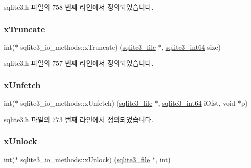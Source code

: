 sqlite3.\+h 파일의 758 번째 라인에서 정의되었습니다.

\mbox{\label{structsqlite3__io__methods_abe797948913bfe94d4fab7246773af50}} 
\subsubsection{\texorpdfstring{x\+Truncate}{xTruncate}}
{\footnotesize\ttfamily int($\ast$ sqlite3\+\_\+io\+\_\+methods\+::x\+Truncate) (\hyperlink{structsqlite3__file}{sqlite3\+\_\+file} $\ast$, \hyperlink{sqlite3_8h_a0a4d3e6c1ad46f90e746b920ab6ca0d2}{sqlite3\+\_\+int64} size)}



sqlite3.\+h 파일의 757 번째 라인에서 정의되었습니다.

\mbox{\label{structsqlite3__io__methods_abebf1bbaa50bea56f0e37d0f66193bda}} 
\subsubsection{\texorpdfstring{x\+Unfetch}{xUnfetch}}
{\footnotesize\ttfamily int($\ast$ sqlite3\+\_\+io\+\_\+methods\+::x\+Unfetch) (\hyperlink{structsqlite3__file}{sqlite3\+\_\+file} $\ast$, \hyperlink{sqlite3_8h_a0a4d3e6c1ad46f90e746b920ab6ca0d2}{sqlite3\+\_\+int64} i\+Ofst, void $\ast$p)}



sqlite3.\+h 파일의 773 번째 라인에서 정의되었습니다.

\mbox{\label{structsqlite3__io__methods_a5ce75a5ca2df9c1edcaef74d4c0d7e38}} 
\subsubsection{\texorpdfstring{x\+Unlock}{xUnlock}}
{\footnotesize\ttfamily int($\ast$ sqlite3\+\_\+io\+\_\+methods\+::x\+Unlock) (\hyperlink{structsqlite3__file}{sqlite3\+\_\+file} $\ast$, int)}



